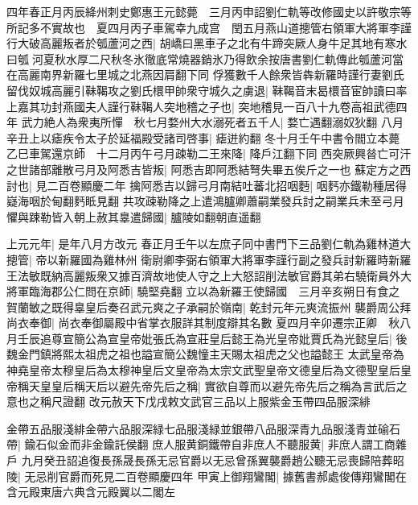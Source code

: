 四年春正月丙辰絳州刺史鄭惠王元懿薨　三月丙申詔劉仁軌等改修國史以許敬宗等所記多不實故也　夏四月丙子車駕幸九成宫　閏五月燕山道摠管右領軍大將軍李謹行大破高麗叛者於瓠蘆河之西|{
	胡嶠曰黑車子之北有牛蹄突厥人身牛足其地有寒水曰瓠河夏秋水厚二尺秋冬氷徹底常燒器銷氷乃得飲余按唐書劉仁軌傳此瓠蘆河當在高麗南界新羅七里城之北燕因肩翻下同}
俘獲數千人餘衆皆犇新羅時謹行妻劉氏留伐奴城高麗引靺鞨攻之劉氏檈甲帥衆守城久之虜退|{
	靺鞨音末曷檈音宦帥讀曰率}
上嘉其功封燕國夫人謹行靺鞨人突地稽之子也|{
	突地稽見一百八十九卷高祖武德四年}
武力絶人為衆夷所憚　秋七月婺州大水溺死者五千人|{
	婺亡遇翻溺奴狄翻}
八月辛丑上以瘧疾令太子於延福殿受諸司啓事|{
	瘧迸約翻}
冬十月壬午中書令閻立本薨　乙巳車駕還京師　十二月丙午弓月疎勒二王來降|{
	降戶江翻下同}
西突厥興㫺亡可汗之世諸部離散弓月及阿悉吉皆叛|{
	阿悉吉即阿悉結弩失畢五俟斤之一也}
蘇定方之西討也|{
	見二百卷顯慶二年}
擒阿悉吉以歸弓月南結吐蕃北招咽麪|{
	咽麫亦鐵勒種居得嶷海咽於甸翻麫眡見翻}
共攻疎勒降之上遣鴻臚卿蕭嗣業發兵討之嗣業兵未至弓月懼與踈勒皆入朝上赦其辠遣歸國|{
	臚陵如翻朝直遥翻}


上元元年|{
	是年八月方改元}
春正月壬午以左庶子同中書門下三品劉仁軌為雞林道大摠管|{
	帝以新羅國為雞林州}
衛尉卿李弼右領軍大將軍李謹行副之發兵討新羅時新羅王法敏既納高麗叛衆又據百濟故地使人守之上大怒詔削法敏官爵其弟右驍衛員外大將軍臨海郡公仁問在京師|{
	驍堅堯翻}
立以為新羅王使歸國　三月辛亥朔日有食之　賀蘭敏之既得辠皇后奏召武元爽之子承嗣於嶺南|{
	乾封元年元爽流振州}
襲爵周公拜尚衣奉御|{
	尚衣奉御屬殿中省掌衣服詳其制度辯其名數}
夏四月辛卯遷宗正卿　秋八月壬辰追尊宣簡公為宣皇帝妣張氏為宣莊皇后懿王為光皇帝妣賈氏為光懿皇后|{
	後魏金門鎮將熙太祖虎之祖也謚宣簡公魏憧主天賜太祖虎之父也謚懿王}
太武皇帝為神堯皇帝太穆皇后為太穆神皇后文皇帝為太宗文武聖皇帝文德皇后為文德聖皇后皇帝稱天皇皇后稱天后以避先帝先后之稱|{
	實欲自尊而以避先帝先后之稱為言武后之意也之稱尺證翻}
改元赦天下戊戌敕文武官三品以上服紫金玉帶四品服深緋

金帶五品服淺緋金帶六品服深緑七品服淺緑並銀帶八品服深青九品服淺青並䃋石帶|{
	鍮石似金而非金鍮託侯翻}
庶人服黄銅鐵帶自非庶人不聽服黄|{
	非庶人謂工商雜戶}
九月癸丑詔追復長孫晟長孫无忌官爵以无忌曾孫翼襲爵趙公聽无忌喪歸陪葬昭陵|{
	无忌削官爵而死見二百卷顯慶四年}
甲寅上御翔鸞閣|{
	據舊書郝處俊傳翔鸞閣在含元殿東唐六典含元殿翼以二閣左}


